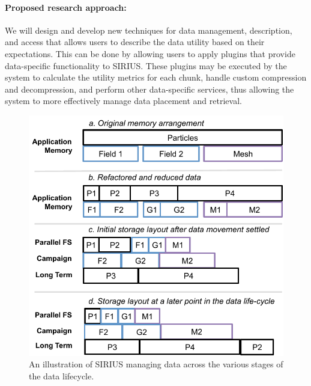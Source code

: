 \paragraph{Proposed research approach:} 
We will design and develop new techniques for data management, description,
and access that allows users to describe the data utility based on their
expectations. This can be done by allowing users to apply plugins that
provide data-specific functionality to SIRIUS.
These plugins may be executed by the system to
calculate the utility metrics for each chunk, handle custom compression
and decompression, and perform other data-specific services, thus allowing
the system to more effectively manage data placement and retrieval.
%

\begin{figure}
        \begin{centering}
        \vspace{-4ex}
        \includegraphics[scale=0.7]{graphics/SSIO-bucket.pdf}
        \caption{An illustration of SIRIUS managing data across the various stages of the data lifecycle.}
        \label{fig:ssio-bucket}
        \end{centering}
      \vspace{-1ex}
\end{figure}

